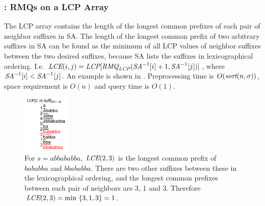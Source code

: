 \documentclass[a4]{article}
\newcommand*{\pref}{\prettyref}
\begin{document}
\subsubsection{: RMQs on a LCP Array}

The LCP array contains the length of the longest common prefixes of each pair of neighbor suffixes in SA. The length of the longest common prefix of two arbitrary suffixes in SA can be found as the minimum of all LCP values of neighbor suffixes between the two desired suffixes, because SA lists the suffixes in lexicographical ordering. I.e. $\textit{LCE}(i,j)=\textit{LCP}[\textit{RMQ}_{\textit{LCP}}(\textit{SA}^{-1}[i] + 1, \textit{SA}^{-1}[j])]$, where $\textit{SA}^{-1}[i] < \textit{SA}^{-1}[j]$. An example is shown in \pref{fig:sa+lcp+min}. Preprocessing time is $O(\textit{sort}(n,\sigma))$, space requirement is $O(n)$ and query time is $O(1)$.

\begin{figure}[tp]
    \begin{center}
        \includegraphics[width=0.2\textwidth,page=1]{sa+lcp+min.pdf}
    \end{center}
    \caption{\label{fig:sa+lcp+min}For $s=abbababba$, $\textit{LCE}(2,3)$ is the longest common prefix of $bababba$ and $bbababba$. There are two other suffixes between these in the lexicographical ordering, and the longest common prefixes between each pair of neighbors are 3, 1 and 3. Therefore $\textit{LCE}(2,3)= \min ~ \{3, 1, 3\} = 1$.}
\end{figure}
\end{document}
